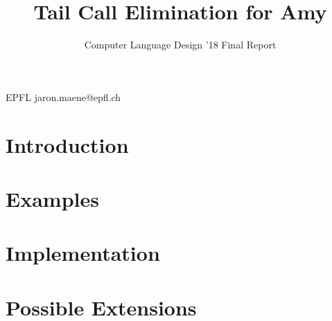 \documentclass[nocopyrightspace,11pt,authoryear,preprint]{sigplanconf}
\begin{document}


\title{Tail Call Elimination for Amy}
\subtitle{Computer Language Design '18 Final Report}

           {EPFL}
           {jaron.maene@epfl.ch}

\maketitle

\section{Introduction}


\section{Examples}


\section{Implementation}


\section{Possible Extensions}




\end{document}
